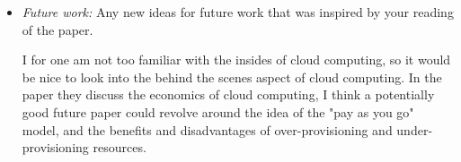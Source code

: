 \documentclass[letterpaper,twocolumn,10pt]{article}
\begin{document}
\begin{itemize}
\item {\it Future work:} Any new ideas for future work that was inspired by
your reading of the paper.

I for one am not too familiar with the insides of cloud computing, so it would be nice to look into the behind the 
scenes aspect of cloud computing. In the paper they discuss the economics of cloud computing, I think a potentially 
good future paper could revolve around the idea of the "pay as you go" model, and the benefits and disadvantages of 
over-provisioning and under-provisioning resources. 

\end{itemize}

{
  \small 
  
  
}
\end{document}
